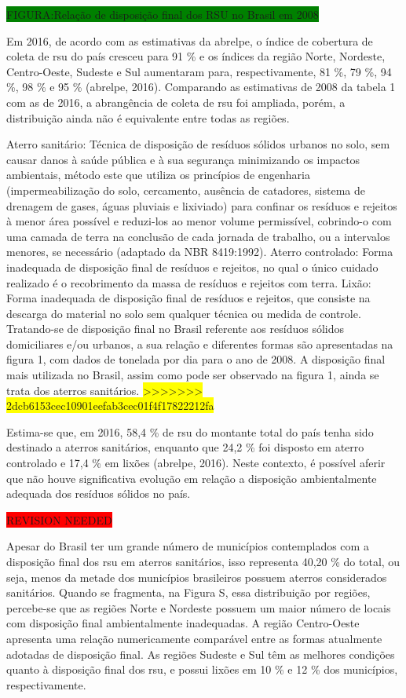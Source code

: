 \colorbox{green}{FIGURA:Relação de disposição final dos RSU no Brasil em 2008}

	Em 2016, de acordo com as estimativas da \gls{abrelpe}, o índice de cobertura de coleta de \gls{rsu} do país cresceu para 91 \% e os índices da região Norte, Nordeste, Centro-Oeste, Sudeste e Sul aumentaram para, respectivamente, 81 \%, 79 \%, 94 \%, 98 \% e 95 \% (\gls{abrelpe}, 2016). Comparando as estimativas de 2008 da tabela 1 com as de 2016, a abrangência de coleta de \gls{rsu} foi ampliada, porém, a distribuição ainda não é equivalente entre todas as regiões.
	
	Aterro sanitário: Técnica de disposição de resíduos sólidos urbanos no solo, sem causar danos à saúde pública e à sua segurança minimizando os	impactos ambientais, método este que utiliza os princípios de engenharia (impermeabilização do solo, cercamento, ausência de catadores, sistema de
	drenagem de gases, águas pluviais e lixiviado) para confinar os resíduos e rejeitos à menor área possível e reduzi-los ao menor volume permissível,
	cobrindo-o com uma camada de terra na conclusão de cada jornada de trabalho, ou a intervalos menores, se necessário (adaptado da NBR 8419:1992).
	Aterro controlado: Forma inadequada de disposição final de resíduos e rejeitos, no qual o único cuidado realizado é o recobrimento da massa
	de resíduos e rejeitos com terra.
	Lixão: Forma inadequada de disposição final de resíduos e rejeitos, que consiste na descarga do material no solo sem qualquer técnica ou
	medida de controle.
	Tratando-se de disposição final no Brasil referente aos resíduos sólidos domiciliares e/ou urbanos, a sua relação e diferentes formas são apresentadas na figura 1, com dados de tonelada por dia para o ano de 2008. A disposição final mais utilizada no Brasil, assim como pode ser observado na figura 1, ainda se trata dos aterros sanitários. 
\colorbox{yellow}{>>>>>>> 2dcb6153cec10901eefab3cec01f4f17822212fa}
	
	Estima-se que, em 2016, 58,4 \% de \gls{rsu} do montante total do país tenha sido destinado a aterros sanitários, enquanto que 24,2 \% foi disposto em aterro controlado e 17,4 \% em lixões (\gls{abrelpe}, 2016). Neste contexto, é possível aferir que não houve significativa evolução em relação a disposição ambientalmente adequada dos resíduos sólidos no país.
	
	\colorbox{red}{REVISION NEEDED}
	
	Apesar do Brasil ter um grande número de municípios contemplados com a disposição final dos \gls{rsu} em aterros sanitários, isso representa 40,20 \% do total, ou seja, menos da metade dos municípios brasileiros possuem aterros considerados sanitários. Quando se fragmenta, na Figura S, essa distribuição por regiões, percebe-se que as regiões Norte e Nordeste possuem um maior número de locais com disposição final ambientalmente inadequadas. A região Centro-Oeste apresenta uma relação numericamente comparável entre as formas atualmente adotadas de disposição final. As regiões Sudeste e Sul têm as melhores condições quanto à disposição final dos \gls{rsu}, e possui lixões em 10 \% e 12 \% dos municípios, respectivamente.
	
